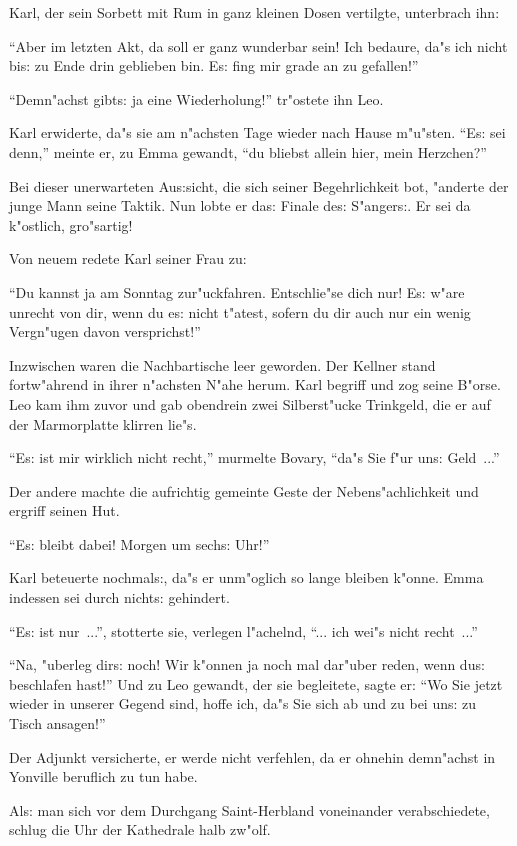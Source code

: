 \documentclass[oneside,12pt]{book}
\newcommand{\s}{s:}%
\begin{document}
Karl, der sein Sorbett mit Rum in ganz kleinen Dosen vertilgte,
unterbrach ihn:

"`Aber im letzten Akt, da soll er ganz wunderbar sein! Ich
bedaure, da"s ich nicht bi{\s} zu Ende drin geblieben bin. E{\s}
fing mir grade an zu gefallen!"'

"`Demn"achst gibt{\s} ja eine Wiederholung!"' tr"ostete ihn Leo.

Karl erwiderte, da"s sie am n"achsten Tage wieder nach Hause
m"u"sten. "`E{\s} sei denn,"' meinte er, zu Emma gewandt, "`du
bliebst allein hier, mein Herzchen?"'

Bei dieser unerwarteten Au{\s}sicht, die sich seiner
Begehrlichkeit bot, "anderte der junge Mann seine Taktik. Nun
lobte er da{\s} Finale de{\s} S"anger{\s}. Er sei da k"ostlich,
gro"sartig!

Von neuem redete Karl seiner Frau zu:

"`Du kannst ja am Sonntag zur"uckfahren. Entschlie"se dich nur!
E{\s} w"are unrecht von dir, wenn du e{\s} nicht t"atest, sofern
du dir auch nur ein wenig Vergn"ugen davon versprichst!"'

Inzwischen waren die Nachbartische leer geworden. Der Kellner
stand fortw"ahrend in ihrer n"achsten N"ahe herum. Karl begriff
und zog seine B"orse. Leo kam ihm zuvor und gab obendrein zwei
Silberst"ucke Trinkgeld, die er auf der Marmorplatte klirren
lie"s.

"`E{\s} ist mir wirklich nicht recht,"' murmelte Bovary, "`da"s
Sie f"ur un{\s} Geld~..."'

Der andere machte die aufrichtig gemeinte Geste der
Nebens"achlichkeit und ergriff seinen Hut.

"`E{\s} bleibt dabei! Morgen um sech{\s} Uhr!"'

Karl beteuerte nochmal{\s}, da"s er unm"oglich so lange bleiben
k"onne. Emma indessen sei durch nicht{\s} gehindert.

"`E{\s} ist nur~..."', stotterte sie, verlegen l"achelnd, "`... ich
wei"s nicht recht~..."'

"`Na, "uberleg dir{\s} noch! Wir k"onnen ja noch mal dar"uber
reden, wenn du{\s} beschlafen hast!"' Und zu Leo gewandt, der sie
begleitete, sagte er: "`Wo Sie jetzt wieder in unserer Gegend
sind, hoffe ich, da"s Sie sich ab und zu bei un{\s} zu Tisch
ansagen!"'

Der Adjunkt versicherte, er werde nicht verfehlen, da er ohnehin
dem\-n"achst in Yonville beruflich zu tun habe.

Al{\s} man sich vor dem Durchgang Saint-Herbland voneinander
verabschiedete, schlug die Uhr der Kathedrale halb zw"olf.
\end{document}
